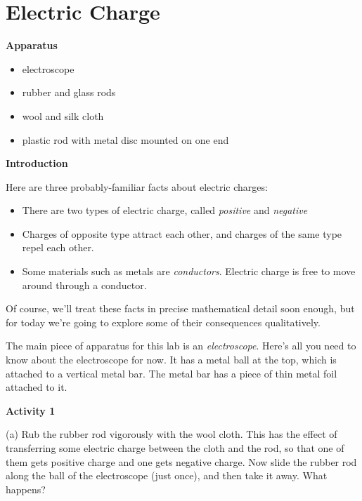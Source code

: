 \section{Electric Charge}
\begin{comment}
This lab was written by Ted Bunn for spring of 2016.  It was edited slightly by Matt Trawick for this manual in April 2016.

\end{comment}

\makelabheader %

\bigskip
\textbf{Apparatus}
\vspace{-\parskip}
\begin{itemize}
\item electroscope
\item rubber and glass rods
\item wool and silk cloth
\item plastic rod with metal disc mounted on one end
\end{itemize}

\bigskip
\textbf{Introduction}

Here are three probably-familiar facts about electric charges:

\vspace{-\parskip}
\begin{itemize}
\item There are two types of electric charge, called \textit{positive}
and \textit{negative}
\item Charges of opposite type attract each other, and charges of the same type
repel each other.
\item Some materials such as metals are \textit{conductors}. Electric charge 
is free to move around through a conductor. 
\end{itemize}

Of course, we'll treat these facts in precise mathematical detail soon
enough, but for today we're going to explore some of their consequences 
qualitatively.

The main piece of apparatus for this lab is an \textit{electroscope}. 
Here's all you need to know about the electroscope for now. It has
a metal ball at the top, which is attached to a vertical metal bar.
The metal bar has a piece of thin metal foil attached to it. 

\textbf{Activity 1}

(a) Rub the rubber rod vigorously with the wool cloth.
This has the effect of transferring some electric charge between the
cloth and the rod, so that one of them gets positive charge and one gets
negative charge.  Now slide the rubber rod along the ball of the electroscope (just once), and then take it away.
What happens?

